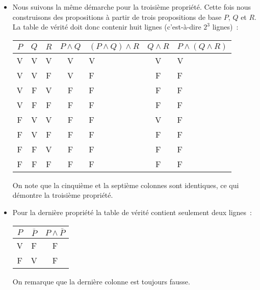 \documentclass[10pt,notheorems]{beamer}
\theoremstyle{plain}
\theoremstyle{definition} %
\begin{document}
\begin{notes}
\begin{itemize}
  \item Nous suivons la même démarche pour la troisième
    propriété. Cette fois nous construisons des propositions à
    partir de trois propositions de base $P$, $Q$ et $R$. La table
    de vérité doit donc contenir huit lignes (c'est-à-dire $2^3$ lignes)~:
    \begin{table}[H]
      \centering
      \begin{tabular}[H]{|ccc|cgcg|}
        \hline
        $P$ & $Q$ & $R$ & $P\land Q$ & $(P\land Q)\land R$ & $Q\land R$ & $P \land (Q \land R)$ \\ \hline
        V & V & V & V & V & V & V\\
        V & V & F & V & F & F & F\\
        V & F & V & F & F & F & F\\
        V & F & F & F & F & F & F\\
        F & V & V & F & F & V & F\\
        F & V & F & F & F & F & F\\
        F & F & V & F & F & F & F\\
        F & F & F & F & F & F & F\\
        \hline\hline
      \end{tabular}
    \end{table}
    On note que la cinquième et la septième colonnes sont identiques, ce qui démontre la troisième propriété.

  \item Pour la dernière propriété la table de vérité contient seulement deux lignes~:
    \begin{table}
      \centering
      \begin{tabular}[H]{|c|cc|}
        \hline
        $P$ & $\bar P$ & $P \land \bar P$\\ \hline
        V & F & F\\
        F & V & F\\
        \hline\hline
      \end{tabular}
    \end{table}
    On remarque que la dernière colonne est toujours fausse.

  \end{itemize}

\end{notes}
\end{document}
